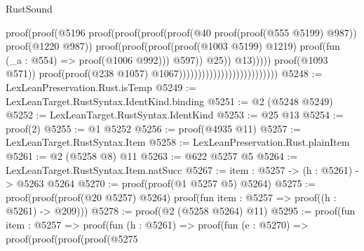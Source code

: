 \begin{lexlean}{RustSound}
\begin{coremodule}
                                                                      proof(proof(@5196
                                                                            proof(proof(proof(proof(@40
                                                                                      proof(proof(@555
                                                                                            @5199)
                                                                                          @987))
                                                                                    proof(@1220
                                                                                        @987))
                                                                                  proof(proof(proof(proof(@1003
                                                                                            @5199)
                                                                                          @1219)
                                                                                        proof(fun (_a : @554) =>
                                                                                          proof(@1006
                                                                                              @992)))
                                                                                      @597))
                                                                                @25))
                                                                          @13)))))
                                                            proof(@1093 @571))
                                                          proof(proof(@238 @1057)
                                                              @1067))))))))))))))))))))))))))
@5248 := LexLeanPreservation.Rust.isTemp
@5249 := LexLeanTarget.RustSyntax.IdentKind.binding
@5251 := @2 (@5248 @5249)
@5252 := LexLeanTarget.RustSyntax.IdentKind
@5253 := @25 @13
@5254 := proof(2)
@5255 := @1 @5252
@5256 := proof(@4935 @11)
@5257 := LexLeanTarget.RustSyntax.Item
@5258 := LexLeanPreservation.Rust.plainItem
@5261 := @2 (@5258 @8) @11
@5263 := @622 @5257 @5
@5264 := LexLeanTarget.RustSyntax.Item.natSucc
@5267 := {item : @5257} -> (h : @5261) -> @5263 @5264
@5270 := proof(proof(@1 @5257 @5) @5264)
@5275 := proof(proof(proof(@20 @5257) @5264)
      proof(fun {item : @5257} => proof((h : @5261) -> @209)))
@5278 := proof(@2 (@5258 @5264) @11)
@5295 := proof(fun {item : @5257} =>
    proof(fun (h : @5261) =>
      proof(fun (e : @5270) =>
        proof(proof(proof(proof(@5275

\end{coremodule}
\end{lexlean}
